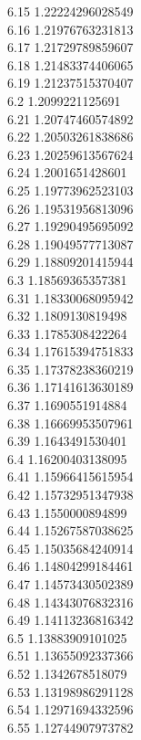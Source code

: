 {6.15	1.22224296028549\\
6.16	1.21976763231813\\
6.17	1.21729789859607\\
6.18	1.21483374406065\\
6.19	1.21237515370407\\
6.2	1.2099221125691\\
6.21	1.20747460574892\\
6.22	1.20503261838686\\
6.23	1.20259613567624\\
6.24	1.2001651428601\\
6.25	1.19773962523103\\
6.26	1.19531956813096\\
6.27	1.19290495695092\\
6.28	1.19049577713087\\
6.29	1.18809201415944\\
6.3	1.18569365357381\\
6.31	1.18330068095942\\
6.32	1.1809130819498\\
6.33	1.1785308422264\\
6.34	1.17615394751833\\
6.35	1.17378238360219\\
6.36	1.17141613630189\\
6.37	1.1690551914884\\
6.38	1.16669953507961\\
6.39	1.1643491530401\\
6.4	1.16200403138095\\
6.41	1.15966415615954\\
6.42	1.15732951347938\\
6.43	1.1550000894899\\
6.44	1.15267587038625\\
6.45	1.15035684240914\\
6.46	1.14804299184461\\
6.47	1.14573430502389\\
6.48	1.14343076832316\\
6.49	1.14113236816342\\
6.5	1.13883909101025\\
6.51	1.13655092337366\\
6.52	1.1342678518079\\
6.53	1.13198986291128\\
6.54	1.12971694332596\\
6.55	1.12744907973782\\
}
